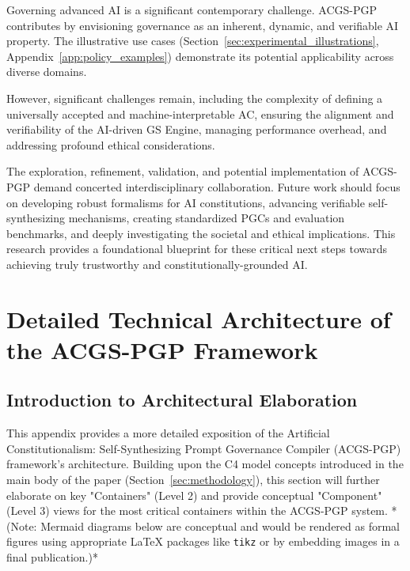 \documentclass[sigconf,review,anonymous=false]{acmart} %
\begin{document}
Governing advanced AI is a significant contemporary challenge. ACGS-PGP contributes by envisioning governance as an inherent, dynamic, and verifiable AI property. The illustrative use cases (Section~\ref{sec:experimental_illustrations}, Appendix~\ref{app:policy_examples}) demonstrate its potential applicability across diverse domains.

However, significant challenges remain, including the complexity of defining a universally accepted and machine-interpretable AC, ensuring the alignment and verifiability of the AI-driven GS Engine, managing performance overhead, and addressing profound ethical considerations.

The exploration, refinement, validation, and potential implementation of ACGS-PGP demand concerted interdisciplinary collaboration. Future work should focus on developing robust formalisms for AI constitutions, advancing verifiable self-synthesizing mechanisms, creating standardized PGCs and evaluation benchmarks, and deeply investigating the societal and ethical implications. This research provides a foundational blueprint for these critical next steps towards achieving truly trustworthy and constitutionally-grounded AI.




\appendix

\section{Detailed Technical Architecture of the ACGS-PGP Framework}
\label{app:architecture}
\subsection{Introduction to Architectural Elaboration}
This appendix provides a more detailed exposition of the Artificial Constitutionalism: Self-Synthesizing Prompt Governance Compiler (ACGS-PGP) framework's architecture. Building upon the C4 model concepts introduced in the main body of the paper (Section~\ref{sec:methodology}), this section will further elaborate on key "Containers" (Level 2) and provide conceptual "Component" (Level 3) views for the most critical containers within the ACGS-PGP system. *(Note: Mermaid diagrams below are conceptual and would be rendered as formal figures using appropriate LaTeX packages like \texttt{tikz} or by embedding images in a final publication.)*
\end{document}
